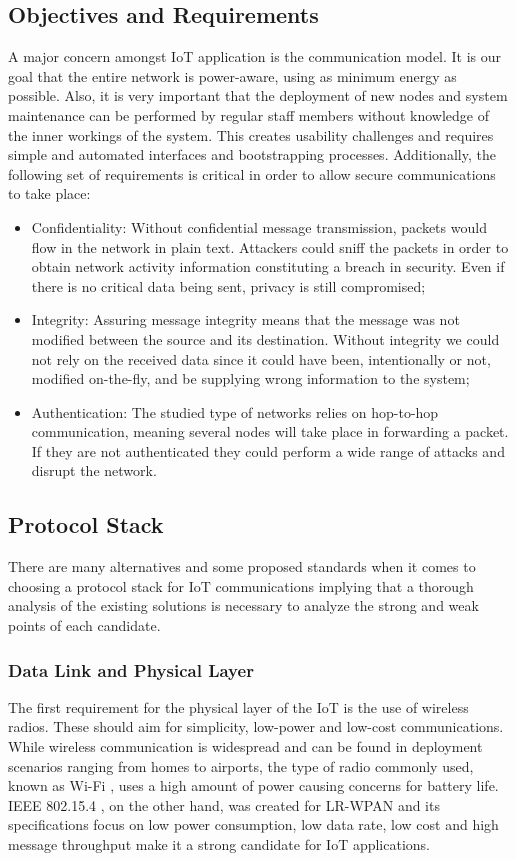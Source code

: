 \documentclass{llncs}
\begin{document}
\subsection{Objectives and Requirements}
A major concern amongst \ac{IoT} application is the communication model. 
It is our goal that the entire network is power-aware, using as minimum energy as possible.
Also, it is very important that the deployment of new nodes and system maintenance can be performed by regular staff members without knowledge of the inner workings of the system.
This creates usability challenges and requires simple and automated interfaces and bootstrapping processes. 
Additionally, the following set of requirements is critical in order to allow secure communications to take place:
\begin{itemize}
	\item Confidentiality: Without confidential message transmission, packets would flow in the network in plain text. 
	Attackers could sniff the packets in order to obtain network activity information constituting a breach in security. 
	Even if there is no critical data being sent, privacy is still compromised;
	\item Integrity: Assuring message integrity means that the message was not modified between the source and its destination. 
	Without integrity we could not rely on the received data since it could have been, intentionally or not, modified on-the-fly, and be supplying wrong information to the system;
	\item Authentication: The studied type of networks relies on hop-to-hop communication, meaning several nodes will take place in forwarding a packet. 
	If they are not authenticated they could perform a wide range of attacks and disrupt the network.
\end{itemize}

\subsection{Protocol Stack}
\label{sec:protocol_stack}
There are many alternatives and some proposed standards when it comes to choosing a protocol stack for \ac{IoT} communications \cite{Al-Fuqaha2015} implying that a thorough analysis of the existing solutions is necessary to analyze the strong and weak points of each candidate.   

\subsubsection{Data Link and Physical Layer}
\label{sec:data_link}
The first requirement for the physical layer of the \ac{IoT} is the use of wireless radios. These should aim for simplicity, low-power and low-cost communications. While wireless communication is widespread and can be found in deployment scenarios ranging from homes to airports, the type of radio commonly used, known as Wi-Fi \cite{IEEE2012}, uses a high amount of power causing concerns for battery life. IEEE 802.15.4 \cite{IEEEComputerSociety2011}, on the other hand, was created for \ac{LR-WPAN} and its specifications focus on low power consumption, low data rate, low cost and high message throughput make it a strong candidate for \ac{IoT} applications.
\end{document}
